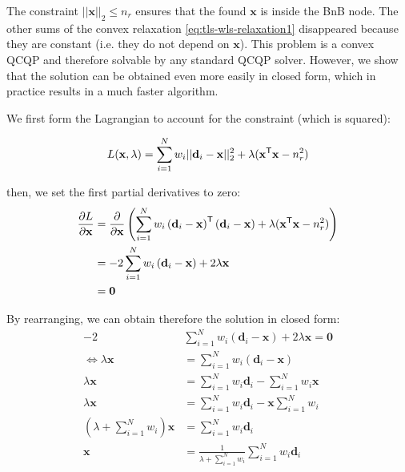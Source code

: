 The constraint $||\mathbf{x}||_2 \leq n_r$ ensures that the found $\mathbf{x}$ is inside the BnB node. The other sums of the convex relaxation \ref{eq:tls-wls-relaxation1} disappeared because they are constant (i.e. they do not depend on $\mathbf{x}$). This problem is a convex QCQP and therefore solvable by any standard QCQP solver. However, we show that the solution can be obtained even more easily in closed form, which in practice results in a much faster algorithm.

We first form the Lagrangian to account for the constraint (which is squared): 

\begin{equation}
	\begin{aligned}	
		L(\mathbf{x}, \lambda) =  \sum_{i=1}^{N} w_i ||\mathbf{d}_i - \mathbf{x}||_2^2 + \lambda (
		\mathbf{x}^{\mathsf{T}} \mathbf{x} - n_r^2)\\
	\end{aligned}
\end{equation}

then, we set the first partial derivatives to zero: 
\begin{equation}
	\begin{aligned}	
		\frac{\partial L}{\partial \mathbf{x}} &= \frac{\partial }{\partial \mathbf{x}} \left( \sum_{i=1}^{N} w_i \left(\mathbf{d}_i - \mathbf{x}\right)^{\mathsf{T}} \left(\mathbf{d}_i - \mathbf{x}\right) + \lambda (
		\mathbf{x}^{\mathsf{T}} \mathbf{x} - n_r^2) \right)\\
		&= - 2\sum_{i=1}^{N} w_i \left(\mathbf{d}_i - \mathbf{x}\right) + 2 \lambda \mathbf{x}\\
		&= \mathbf{0}\\
	\end{aligned}
\end{equation}


By rearranging, we can obtain therefore the solution in closed form:
\begin{equation}
	\label{eq:trans-qcqp-lagrangian}
	\begin{aligned}	
		-2  &\sum_{i=1}^{N}  w_i \left(\mathbf{d}_i - \mathbf{x}\right) + 2 \lambda \mathbf{x} = \mathbf{0}\\
		\iff \lambda \mathbf{x} &= \sum_{i=1}^{N} w_i \left(\mathbf{d}_i - \mathbf{x}\right)\\
		\lambda \mathbf{x} &= \sum_{i=1}^{N}  w_i \mathbf{d}_i  - \sum_{i=1}^{N}  w_i \mathbf{x}\\
		\lambda \mathbf{x} &= \sum_{i=1}^{N}  w_i \mathbf{d}_i  - \mathbf{x} \sum_{i=1}^{N}  w_i\\
		\left( \lambda + \sum_{i=1}^{N}  w_i \right) \mathbf{x} &= \sum_{i=1}^{N} w_i \mathbf{d}_i \\
		\mathbf{x} &= \frac{1}{\lambda + \sum_{i=1}^{N}  w_i} \sum_{i=1}^{N} w_i \mathbf{d}_i 
	\end{aligned}
\end{equation}

